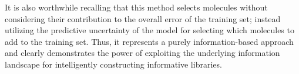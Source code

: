 It is also worthwhile recalling that this method selects molecules without considering their contribution to the overall error of the training set; instead utilizing the predictive uncertainty of the model for selecting which molecules to add to the training set. Thus, it represents a purely information-based approach and clearly demonstrates the power of exploiting the underlying information landscape for intelligently constructing informative libraries.